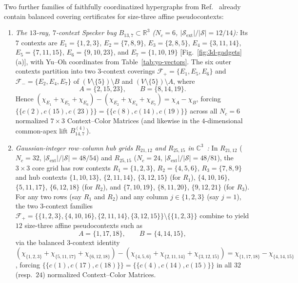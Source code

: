 \documentclass[aps,pra,reprint,superscriptaddress,longbibliography,nofootinbib,floatfix,10pt]{revtex4-2}
\theoremstyle{definition}\newtheorem{definition}[theorem]{Definition}
\theoremstyle{remark}\newtheorem{remark}[theorem]{Remark}
\newcommand{\C}{\mathbb C}\newcommand{\R}{\mathbb R}\newcommand{\Q}{\mathbb Q}
\newcommand{\Sc}{\mathcal S}\newcommand{\Cc}{\mathcal C}\newcommand{\Wc}{\mathcal W}
\begin{document}
Two further families of faithfully coordinatized hypergraphs from Ref.~\cite{2026-latin-context-matrix} already contain balanced covering certificates for size-three affine pseudocontexts:
\begin{enumerate}
\item \emph{The $13$-ray, $7$-context Specker bug $B_{13,7}\subset\R^3$ ($N_c=6$, $|\Sc_{\mathrm{ext}}|/|\Sc|=12/14$):} Its $7$ contexts are $E_1=\{1,2,3\}$, $E_2=\{7,8,9\}$, $E_3=\{2,8,5\}$, $E_4=\{3,11,14\}$, $E_5=\{7,11,15\}$, $E_6=\{9,10,23\}$, and $E_7=\{1,10,19\}$ [Fig.~\ref{fig:3d-gadgets}(a)], with Yu--Oh coordinates from Table~\ref{tab:yo-vectors}. The six outer contexts partition into two $3$-context coverings $\mathcal{F}_+=\{E_1,E_5,E_6\}$ and $\mathcal{F}_-=\{E_2,E_4,E_7\}$ of $(V\setminus\{5\})\setminus B$ and $(V\setminus\{5\})\setminus A$, where
\begin{equation}\label{eq:B13-paired3}
A=\{2,15,23\},\qquad B=\{8,14,19\}.
\end{equation}
Hence $(\chi_{E_1}+\chi_{E_5}+\chi_{E_6})-(\chi_{E_2}+\chi_{E_4}+\chi_{E_7})=\chi_A-\chi_B$, forcing $\{\!\{c(2),c(15),c(23)\}\!\}=\{\!\{c(8),c(14),c(19)\}\!\}$ across all $N_c=6$ normalized $7\times 3$ Context--Color Matrices (and likewise in the $4$-dimensional common-apex lift $B_{14,7}^{(4)}$).

\item \emph{Gaussian-integer row--column hub grids $R_{21,12}$ and $R_{25,15}$ in $\C^3$~\cite[Sec.~IV\,D]{2026-latin-context-matrix}:} In $R_{21,12}$ ($N_c=32$, $|\Sc_{\mathrm{ext}}|/|\Sc|=48/54$) and $R_{25,15}$ ($N_c=24$, $|\Sc_{\mathrm{ext}}|/|\Sc|=48/81$), the $3\times 3$ core grid has row contexts $R_1=\{1,2,3\}$, $R_2=\{4,5,6\}$, $R_3=\{7,8,9\}$ and hub contexts $\{1,10,13\}$, $\{2,11,14\}$, $\{3,12,15\}$ (for $R_1$), $\{4,10,16\}$, $\{5,11,17\}$, $\{6,12,18\}$ (for $R_2$), and $\{7,10,19\}$, $\{8,11,20\}$, $\{9,12,21\}$ (for $R_3$). For any two rows (say $R_1$ and $R_2$) and any column $j\in\{1,2,3\}$ (say $j=1$), the two $3$-context families $\mathcal{F}_+=\{\{1,2,3\},\{4,10,16\},\{2,11,14\},\{3,12,15\}\}\setminus\{\{1,2,3\}\}$ combine to yield $12$ size-three affine pseudocontexts such as
\begin{equation}\label{eq:R21-paired3}
A=\{1,17,18\},\qquad B=\{4,14,15\},
\end{equation}
via the balanced $3$-context identity $(\chi_{\{1,2,3\}}+\chi_{\{5,11,17\}}+\chi_{\{6,12,18\}})-(\chi_{\{4,5,6\}}+\chi_{\{2,11,14\}}+\chi_{\{3,12,15\}})=\chi_{\{1,17,18\}}-\chi_{\{4,14,15\}}$, forcing $\{\!\{c(1),c(17),c(18)\}\!\}=\{\!\{c(4),c(14),c(15)\}\!\}$ in all $32$ (resp.\ $24$) normalized Context--Color Matrices.
\end{enumerate}
\end{document}
